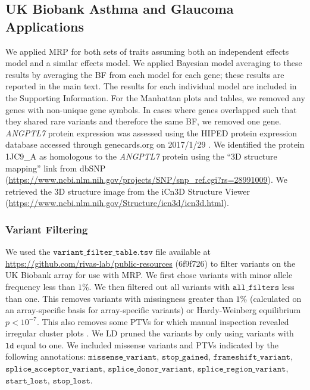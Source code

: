 \subsection*{UK Biobank Asthma and Glaucoma Applications}
We applied MRP for both sets of traits assuming both an independent effects model and a similar effects model. We applied Bayesian model averaging to these results by averaging the BF from each model for each gene; these results are reported in the main text. The results for each individual model are included in the Supporting Information. For the Manhattan plots and tables, we removed any genes with non-unique gene symbols. In cases where genes overlapped such that they shared rare variants and therefore the same BF, we removed one gene. \textit{ANGPTL7} protein expression was assessed using the HIPED protein expression database accessed through genecards.org on 2017/1/29 \cite{Fishilevich:2016hx}. We identified the protein 1JC9\_A as homologous to the \textit{ANGPTL7} protein using the ``3D structure mapping'' link from dbSNP (\url{https://www.ncbi.nlm.nih.gov/projects/SNP/snp_ref.cgi?rs=28991009}). We retrieved the 3D structure image from the iCn3D Structure Viewer (\url{https://www.ncbi.nlm.nih.gov/Structure/icn3d/icn3d.html}). 

\subsubsection*{Variant Filtering}
We used the $\texttt{variant\_filter\_table.tsv}$ file available at \url{https://github.com/rivas-lab/public-resources} (6f9f726) to filter variants on the UK Biobank array for use with MRP. We first chose variants with minor allele frequency less than $1\%$. We then filtered out all variants with $\texttt{all\_filters}$ less than one. This removes variants with missingness greater than $1\%$ (calculated on an array-specific basis for array-specific variants) or Hardy-Weinberg equilibrium $p < 10^{-7}$. This also removes some PTVs for which manual inspection revealed irregular cluster plots \cite{DeBoever179762}. We LD pruned the variants by only using variants with $\texttt{ld}$ equal to one. We included missense variants and PTVs indicated by the following annotations: $\texttt{missense\_variant}$, 
$\texttt{stop\_gained}$, $\texttt{frameshift\_variant}$, $\texttt{splice\_acceptor\_variant}$, $\texttt{splice\_donor\_variant}$, $\texttt{splice\_region\_variant}$, $\texttt{start\_lost}$, $\texttt{stop\_lost}$.

